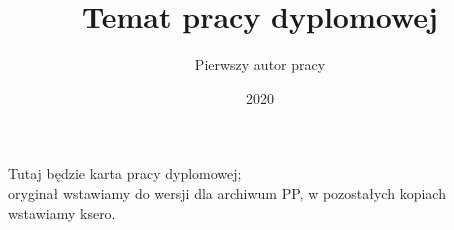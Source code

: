 \documentclass[10pt,a4paper,english,thesis]{dcsbook}
\begin{document}

\author{Pierwszy autor pracy}
\title{Temat pracy dyplomowej}
\date{2020}
\maketitle
\frontmatter



\thispagestyle{empty}\vspace*{\fill}%
\begin{center}Tutaj będzie karta pracy dyplomowej;\\oryginał wstawiamy do wersji dla archiwum PP, w pozostałych kopiach wstawiamy ksero.\end{center}%
\vfill\cleardoublepage%


\tableofcontents{}
\mainmatter








% 
% 


\backmatter

{\raggedright\sloppy\small}


% 


\end{document}
